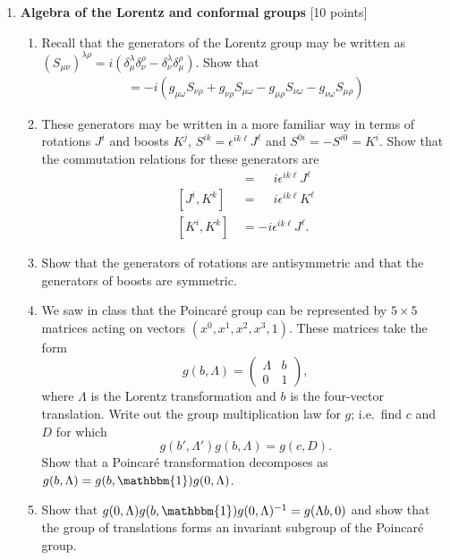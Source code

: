 \documentclass[12pt]{article}
\begin{document}
\begin{enumerate}

\item {\bf Algebra of the Lorentz and conformal groups} [10 points]

\begin{enumerate}

\item Recall that the generators of the Lorentz group may be written as $\left(S_{\mu\nu}\right)^{\lambda\rho} = i\left(\delta^\lambda_\mu \delta^\rho_\nu - \delta^\lambda_\nu \delta^{\rho}_{\mu}\right).$
Show that
\begin{align}
[S_{\mu\nu},S_{\omega\rho}]
=
-i (g_{\mu\omega} S_{\nu\rho} + g_{\nu\rho} S_{\mu\omega} - g_{\mu\rho} S_{\nu\omega} - g_{\nu\omega} S_{\mu\rho})
\label{eq:Lorentz:Algebra}
\end{align}

\item These generators may be written in a more familiar way in terms of rotations $J^i$ and boosts $K^j$, $S^{ik} = \epsilon^{ik\ell} J^{\ell}$ and $S^{0i} = -S^{i0} = K^i$. Show that the commutation relations for these generators are
\begin{align*}
[J^i, J^k] \,&= \phantom{+}i\epsilon^{ik\ell} J^\ell\\
[J^i,K^k]\,&= \phantom{+}i\epsilon^{ik\ell} K^\ell\\
[K^i, K^k] \,&= -i\epsilon^{ik\ell} J^\ell.
\end{align*}

\item Show that the generators of rotations are antisymmetric and that the generators of boosts are symmetric.

\item We saw in class that the Poincar\'e group can be represented by $5\times 5$ matrices acting on vectors $(x^0,x^1,x^2,x^3,1)$. These matrices take the form
$$g(b,\Lambda) = 
\begin{pmatrix}
 \Lambda & b \\
 0 & 1
\end{pmatrix},$$
where $\Lambda$ is the Lorentz transformation and $b$ is the four-vector translation. Write out the group multiplication law for $g$; i.e.\ find $c$ and $D$ for which
$$g(b',\Lambda') g(b,\Lambda) = g(c,D).$$
Show that a Poincar\'e transformation decomposes as $g(b,\Lambda)=g(b,\mathbbm{1}) g(0,\Lambda)$.

\item Show that $g(0,\Lambda) g(b,\mathbbm{1}) g(0,\Lambda)^{-1} = g(\Lambda b,0)$ and show that the group of translations forms an invariant subgroup of the Poincar\'e group.



\end{enumerate}
\end{enumerate}
\end{document}
